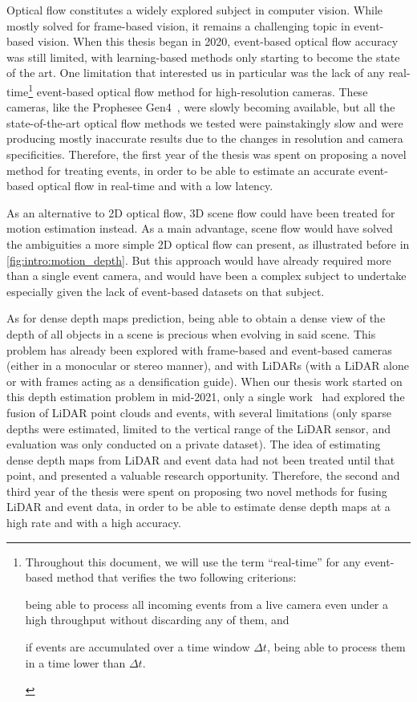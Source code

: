 Optical flow constitutes a widely explored subject in computer vision. While mostly solved for frame-based vision, it remains a challenging topic in event-based vision. When this thesis began in 2020, event-based optical flow accuracy was still limited, with learning-based methods only starting to become the state of the art. One limitation that interested us in particular was the lack of any real-time\footnote{Throughout this document, we will use the term ``real-time'' for any event-based method that verifies the two following criterions: \begin{enumerate*}[label=\textbf{(\arabic*)}]\item being able to process all incoming events from a live camera even under a high throughput without discarding any of them, and \item if events are accumulated over a time window \(\Delta t\), being able to process them in a time lower than \(\Delta t\).\end{enumerate*}} event-based optical flow method for high-resolution cameras. These cameras, like the Prophesee Gen4~\cite{Finateu2020510A1}, were slowly becoming available, but all the state-of-the-art optical flow methods we tested were painstakingly slow and were producing mostly inaccurate results due to the changes in resolution and camera specificities. Therefore, the first year of the thesis was spent on proposing a novel method for treating events, in order to be able to estimate an accurate event-based optical flow in real-time and with a low latency.

As an alternative to 2D optical flow, 3D scene flow could have been treated for motion estimation instead. As a main advantage, scene flow would have solved the ambiguities a more simple 2D optical flow can present, as illustrated before in \cref{fig:intro:motion_depth}. But this approach would have already required more than a single event camera, and would have been a complex subject to undertake especially given the lack of event-based datasets on that subject.

As for dense depth maps prediction, being able to obtain a dense view of the depth of all objects in a scene is precious when evolving in said scene. This problem has already been explored with frame-based and event-based cameras (either in a monocular or stereo manner), and with LiDARs (with a LiDAR alone or with frames acting as a densification guide). When our thesis work started on this depth estimation problem in mid-2021, only a single work~\cite{Li2021Enhancing3L} had explored the fusion of LiDAR point clouds and events, with several limitations (only sparse depths were estimated, limited to the vertical range of the LiDAR sensor, and evaluation was only conducted on a private dataset). The idea of estimating dense depth maps from LiDAR and event data had not been treated until that point, and presented a valuable research opportunity. Therefore, the second and third year of the thesis were spent on proposing two novel methods for fusing LiDAR and event data, in order to be able to estimate dense depth maps at a high rate and with a high accuracy.

